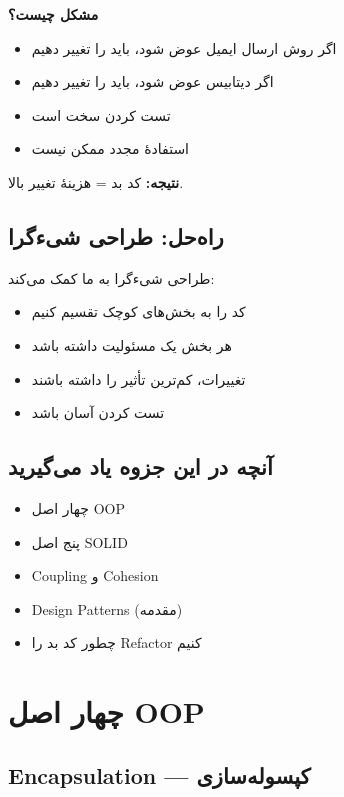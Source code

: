 \documentclass[12pt, a4paper]{article}
\begin{document}
\textbf{مشکل چیست؟}
\begin{itemize}
    \item اگر روش ارسال ایمیل عوض شود، باید  را تغییر دهیم
    \item اگر دیتابیس عوض شود، باید  را تغییر دهیم
    \item تست کردن سخت است
    \item استفادهٔ مجدد ممکن نیست
\end{itemize}

\textbf{نتیجه:} کد بد = هزینهٔ تغییر بالا.

\subsection{راه‌حل: طراحی شیءگرا}

طراحی شیءگرا به ما کمک می‌کند:
\begin{itemize}
    \item کد را به بخش‌های کوچک تقسیم کنیم
    \item هر بخش یک مسئولیت داشته باشد
    \item تغییرات، کم‌ترین تأثیر را داشته باشند
    \item تست کردن آسان باشد
\end{itemize}

\subsection{آنچه در این جزوه یاد می‌گیرید}

\begin{itemize}
    \item چهار اصل OOP
    \item پنج اصل SOLID
    \item Coupling و Cohesion
    \item Design Patterns (مقدمه)
    \item چطور کد بد را Refactor کنیم
\end{itemize}

\section{چهار اصل OOP}

\subsection{Encapsulation — کپسوله‌سازی}
\end{document}
